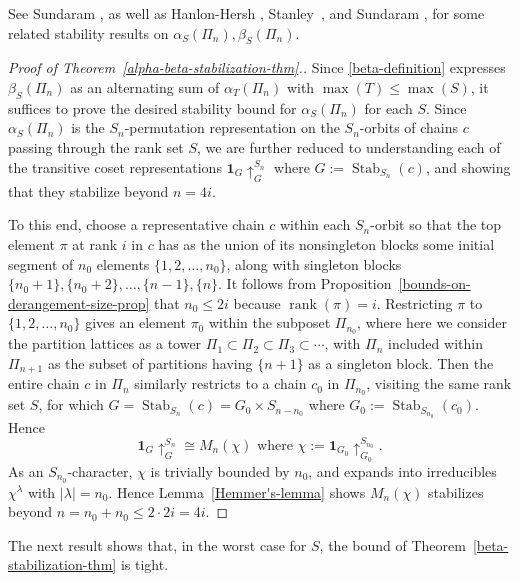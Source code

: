\documentclass[12pt]{amsart}
\theoremstyle{plain}
\theoremstyle{definition}
\begin{document}
\noindent
See Sundaram \cite[\S 5]{Su2}, as well as 
Hanlon-Hersh \cite[Thm. 2.5]{Hanlon-Hersh}, 
Stanley~\cite[p. 152]{Stanley-aspects}, 
and Sundaram \cite[Rmk. 4.10.2]{Sundaram}, 
for some related stability results on
$\alpha_S(\Pi_n), \beta_S(\Pi_n)$.

\begin{proof}[Proof of Theorem~\ref{alpha-beta-stabilization-thm}.]
Since \eqref{beta-definition} expresses 
$\beta_S(\Pi_n)$ as an alternating sum of $\alpha_T(\Pi_n)$ with
$\max(T) \leq \max(S)$, it suffices  to prove 
the desired stability bound for $\alpha_S(\Pi_n)$ for each $S$.  
Since $\alpha_S(\Pi_n)$ is the $S_n$-permutation representation on the $S_n$-orbits of chains $c$ passing through the rank set $S$, we are further reduced to
understanding each of the transitive coset representations
${{\mathbf{1}}}_G \uparrow_{G}^{S_n}$ where $G:={{\operatorname{Stab}}}_{S_n}(c)$,
and showing that they stabilize beyond $n=4i$.

To this end, choose a representative chain $c$ within each $S_n$-orbit
so that the top element $\pi$ at rank $i$ in $c$ has as the union of
its nonsingleton blocks some initial segment of
$n_0$ elements $\{1,2,\ldots,n_0\}$, 
along with singleton blocks $\{n_0+1\},\{n_0+2\},\ldots,\{n-1\},\{n\}$.
It follows from Proposition~\ref{bounds-on-derangement-size-prop}
that $n_0 \leq 2i$ because ${{\operatorname{rank}}}(\pi)=i$.
Restricting $\pi$ to $\{1,2,\ldots,n_0\}$ gives an element
$\pi_0$ within the
subposet $\Pi_{n_0}$,
where here we consider the partition lattices as a tower 
$\Pi_1 \subset \Pi_2 \subset \Pi_3 \subset \cdots$,
with $\Pi_n$ included within $\Pi_{n+1}$ as the subset of partitions
having $\{n+1\}$ as a singleton block.
Then the entire chain $c$ in $\Pi_n$ 
similarly restricts to a chain $c_0$ in $\Pi_{n_0}$, visiting the same
rank set $S$, for which $G={{\operatorname{Stab}}}_{S_n}(c)= G_0\times S_{n-n_0}$ 
where $G_0:={{\operatorname{Stab}}}_{S_{n_0}}(c_0)$.
Hence
$$
{{\mathbf{1}}}_G \uparrow_{G}^{S_n}
 \cong M_n(\chi) \text{ where }
\chi:={{\mathbf{1}}}_{G_0} \uparrow_{G_0}^{S_{n_0}}.
$$
As an $S_{n_0}$-character, $\chi$ is trivially 
bounded by $n_0$, and expands into irreducibles
$\chi^{\lambda}$ with $|\lambda|=n_0$.
Hence Lemma~\ref{Hemmer's-lemma} shows 
$M_n(\chi)$ stabilizes beyond $n=n_0+n_0\leq 2\cdot 2i=4i$.
\end{proof}

The next result shows that, in the worst case for $S$, the bound of
Theorem~\ref{beta-stabilization-thm} is tight.
\end{document}
